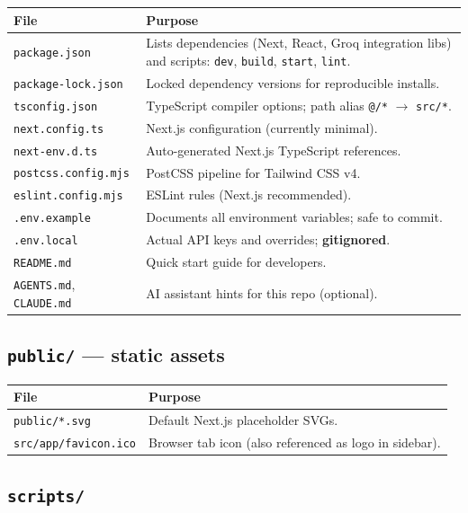 \documentclass[11pt,a4paper]{article}
\begin{document}
\begin{longtable}{@{}p{4.2cm}p{9.8cm}@{}}
\toprule
\textbf{File} & \textbf{Purpose} \\
\midrule
\endhead
\texttt{package.json} & Lists dependencies (Next, React, Groq integration libs) and scripts: \texttt{dev}, \texttt{build}, \texttt{start}, \texttt{lint}. \\
\texttt{package-lock.json} & Locked dependency versions for reproducible installs. \\
\texttt{tsconfig.json} & TypeScript compiler options; path alias \texttt{@/*} $\rightarrow$ \texttt{src/*}. \\
\texttt{next.config.ts} & Next.js configuration (currently minimal). \\
\texttt{next-env.d.ts} & Auto-generated Next.js TypeScript references. \\
\texttt{postcss.config.mjs} & PostCSS pipeline for Tailwind CSS v4. \\
\texttt{eslint.config.mjs} & ESLint rules (Next.js recommended). \\
\texttt{.env.example} & Documents all environment variables; safe to commit. \\
\texttt{.env.local} & Actual API keys and overrides; \textbf{gitignored}. \\
\texttt{README.md} & Quick start guide for developers. \\
\texttt{AGENTS.md}, \texttt{CLAUDE.md} & AI assistant hints for this repo (optional). \\
\bottomrule
\end{longtable}

\subsection{\texttt{public/} --- static assets}

\begin{longtable}{@{}p{4.2cm}p{9.8cm}@{}}
\toprule
\textbf{File} & \textbf{Purpose} \\
\midrule
\endhead
\texttt{public/*.svg} & Default Next.js placeholder SVGs. \\
\texttt{src/app/favicon.ico} & Browser tab icon (also referenced as logo in sidebar). \\
\bottomrule
\end{longtable}

\subsection{\texttt{scripts/}}
\end{document}
